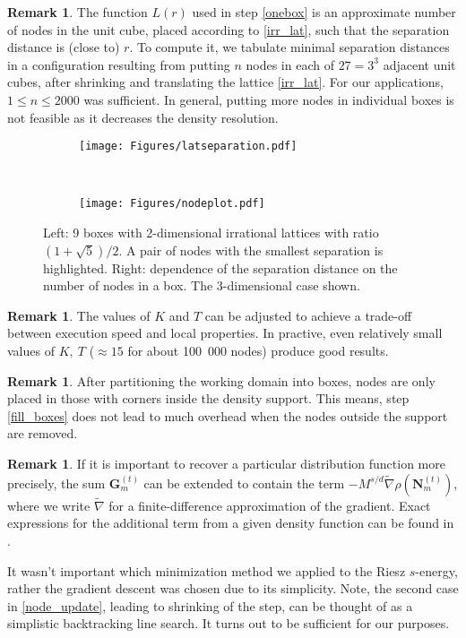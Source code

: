 \documentclass{amsart}
\newcommand{\bs}[1]{\boldsymbol{#1}}
\theoremstyle{definition}
\newtheorem{remark}[theorem]{Remark}
\begin{document}
\begin{remark}\label{Lfun}
	The function $ L(r) $ used in step \eqref{onebox} is an approximate number of nodes in the unit cube, placed according to \eqref{irr_lat}, such that the separation distance is (close to) $ r $. To compute it, we tabulate minimal separation distances in a configuration resulting from putting $ n $ nodes in each of $ 27 = 3^3 $ adjacent unit cubes, after shrinking and translating the lattice \eqref{irr_lat}. For our applications, $ 1\leq n \leq 2000 $ was sufficient. In general, putting more nodes in individual boxes is not feasible as it decreases the density resolution.
 	\begin{figure}
 		\centering
 		\begin{subfigure}{0.48\textwidth}
	 		\texttt{[image: Figures/latseparation.pdf]}
 		\end{subfigure}
 	~\hspace*{.04\textwidth}~
		\begin{subfigure}{0.48\textwidth}
			\texttt{[image: Figures/nodeplot.pdf]}
		\end{subfigure}
	\caption{Left: 9 boxes with 2-dimensional irrational lattices with ratio $ (1+\sqrt{5})/2 $. A pair of nodes with the smallest separation is highlighted. Right: dependence of the separation distance on the number of nodes in a box. The 3-dimensional case shown.}		
 	\end{figure}
 	

	
	
\end{remark}
\begin{remark}\label{KandT}
	The values of $ K $ and $ T $ can be adjusted to achieve a trade-off between execution speed and local properties. In practive, even relatively small values of $ K,\ T $ ($ \approx 15 $ for about 100~000 nodes) produce good results. \\
\end{remark}
\begin{remark}
	After partitioning the working domain into boxes, nodes are only placed in those with corners inside the density support. This means, step \eqref{fill_boxes} does not lead to much overhead when the nodes outside the support are removed.
\end{remark}
\begin{remark}
	If it is important to recover a particular distribution function more precisely, the sum $ \bs{G}_m^{(t)} $ can be extended to contain the term $ -M^{s/d} \widetilde\nabla \rho (\boldsymbol{N}_m^{(t)}) $, where we write $ \widetilde\nabla $ for a finite-difference approximation of the gradient. Exact expressions for the additional term from a given density function can be found in \cite{Hardin2017}.
\end{remark}
It wasn't important which minimization method we applied to the Riesz $ s $-energy, rather the gradient descent was chosen due to its simplicity. Note, the second case in \eqref{node_update}, leading to shrinking of the step, can be thought of as a simplistic backtracking line search. It turns out to be sufficient for our purposes. 
\end{document}

